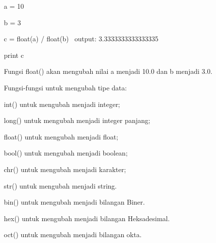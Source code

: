 \noindent 
a = 10 \par
\noindent 
b = 3 \par
\noindent 
c = float(a) / float(b)~ output: 3.3333333333333335 \par
\vspace{12pt}
\noindent 
print c \par
\vspace{12pt}
\noindent 
Fungsi $  $float() $  $akan mengubah nilai $  $a $  $menjadi $  $10.0 $  $dan $  $b $  $menjadi $  $3.0. \par
\vspace{12pt}
\noindent 
Fungsi-fungsi untuk mengubah tipe data: \par
\vspace{12pt}
\noindent 
int() $  $untuk mengubah menjadi integer; \par
\vspace{12pt}
\noindent 
long() $  $untuk mengubah menjadi integer panjang; \par
\vspace{12pt}
\noindent 
float() $  $untuk mengubah menjadi float; \par
\vspace{12pt}
\noindent 
bool() $  $untuk mengubah menjadi boolean; \par
\vspace{12pt}
\noindent 
chr() $  $untuk mengubah menjadi karakter; \par
\vspace{12pt}
\noindent 
str() $  $untuk mengubah menjadi string. \par
\vspace{12pt}
\noindent 
bin() $  $untuk mengubah menjadi bilangan Biner. \par
\vspace{12pt}
\noindent 
hex() $  $untuk mengubah menjadi bilangan Heksadesimal. \par
\vspace{12pt}
\noindent 
oct() $  $untuk mengubah menjadi bilangan okta. \par
\vspace{12pt}
\vspace{12pt}


